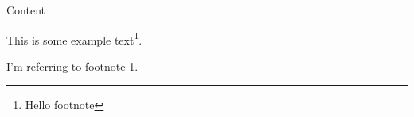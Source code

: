 \documentclass{article}
\begin{document}
Content

This is some example text\footnote{\label{myfootnote}Hello footnote}.

I'm referring to footnote \ref{myfootnote}.
\end{document}
